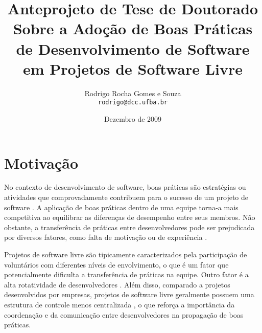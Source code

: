 \documentclass{article}
\title{
{\small Anteprojeto de Tese de Doutorado} \\
Sobre a Adoção de Boas Práticas 
de Desenvolvimento de Software 
em Projetos de Software Livre}
\author{Rodrigo Rocha Gomes e Souza\\
\texttt{rodrigo@dcc.ufba.br}}
\date{Dezembro de 2009}
\begin{document}
\sloppy
\maketitle








\section{Motivação} %

No contexto de desenvolvimento de software, boas práticas são estratégias ou
atividades que comprovadamente contribuem para o sucesso de um projeto de
software \cite{jacobson2007}. A aplicação de boas práticas dentro de uma equipe
torna-a mais competitiva ao equilibrar as diferenças de desempenho entre seus
membros.  Não obstante, a transferência de práticas entre desenvolvedores pode
ser prejudicada por diversos fatores, como falta de motivação ou de experiência
\cite{szulanski1996}.

Projetos de software livre são tipicamente caracterizados pela participação de
voluntários com diferentes níveis de envolvimento, o que é um fator que
potencialmente dificulta a transferência de práticas na equipe. Outro fator é a
alta rotatividade de desenvolvedores \cite{robles2006}. Além disso, comparado a
projetos desenvolvidos por empresas, projetos de software livre geralmente
possuem uma estrutura de controle menos centralizada \cite{raymond2001}, o que
reforça a importância da coordenação e da comunicação entre desenvolvedores na
propagação de boas práticas.
\end{document}
